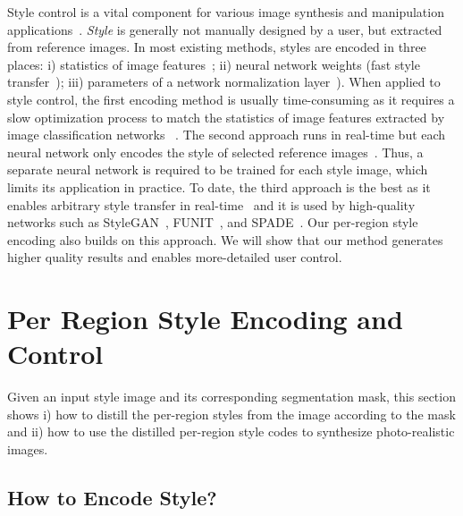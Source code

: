 \documentclass[10pt,twocolumn,letterpaper]{article}
\begin{document}
\vspace*{2mm}
Style control is a vital component for various image synthesis and manipulation applications~\cite{GatysStyle2015,TextureSynthesis2016,Adain2017,karras2018stylebased,abdal2019image2stylegan}.
\textit{Style} is generally not manually designed by a user, but extracted from reference images.
In most existing methods, styles are encoded in three places: i) statistics of image features~\cite{GatysStyle2015,sendik2017deep}; 
ii) neural network weights (\eg fast style transfer~\cite{johnson2016perceptual,zhou2018non,yang2019controllable});
iii) parameters of a network normalization layer~\cite{Adain2017,Kotovenko2019disentangleStyle}).
When applied to style control, the first encoding method is usually time-consuming as it requires a slow optimization process to match the statistics of image features extracted by image classification networks ~\cite{GatysStyle2015}. 
The second approach runs in real-time but each neural network only encodes the style of selected reference images~\cite{johnson2016perceptual}.
Thus, a separate neural network is required to be trained for each style image, which limits its application in practice.
To date, the third approach is the best as it enables arbitrary style transfer in real-time~\cite{Adain2017} and it is used by high-quality networks such as StyleGAN~\cite{karras2018stylebased}, FUNIT~\cite{liu2019fewshot}, and SPADE~\cite{park2019SPADE}.
Our per-region style encoding also builds on this approach. We will show that our method generates higher quality results and enables more-detailed user control.


\section{Per Region Style Encoding and Control}

Given an input style image and its corresponding segmentation mask, this section shows i) how to distill the per-region styles from the image according to the mask and ii) how to use the distilled per-region style codes to synthesize photo-realistic images.

\subsection{How to Encode Style?}
\end{document}
